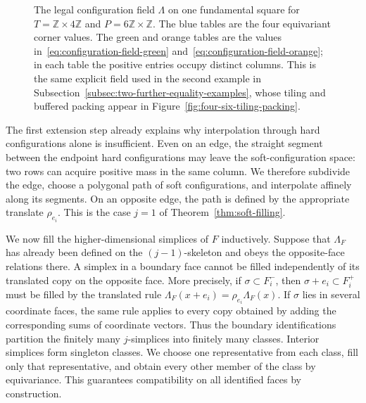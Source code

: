 \documentclass[11pt,reqno]{amsart}
\numberwithin{equation}{section}
\theoremstyle{definition}
\theoremstyle{remark}
\newcommand{\Z}{\mathbb Z}
\begin{document}
\begin{figure}[htbp]
\caption{The legal configuration field $\Lambda$ on one fundamental
square for $T=\Z\times4\Z$ and $P=6\Z\times\Z$.  The blue tables are the
four equivariant corner values.  The green and orange tables are the values
in~\eqref{eq:configuration-field-green} and~\eqref{eq:configuration-field-orange}; in
each table the positive entries occupy distinct columns.  This is the same
explicit field used in the second example in Subsection~\ref{subsec:two-further-equality-examples}, whose tiling
and buffered packing appear in Figure~\ref{fig:four-six-tiling-packing}.}
\label{fig:lambda-plane-configurations}
\end{figure}

The first extension step already explains why interpolation through hard configurations alone is insufficient.
Even on an edge, the straight segment between the endpoint hard
configurations may leave the soft-configuration space: two rows can acquire
positive mass in the same column.  We therefore subdivide the edge, choose a
polygonal path of soft configurations, and interpolate affinely along its
segments.  On an opposite edge, the path is defined by the appropriate
translate $\rho_{e_i}$.  This is the case $j=1$ of
Theorem~\ref{thm:soft-filling}.

We now fill the higher-dimensional simplices of $F$ inductively.  Suppose
that $\Lambda_F$ has already been defined on the $(j-1)$-skeleton and obeys
the opposite-face relations there.  A simplex in a boundary face cannot be
filled independently of its translated copy on the opposite face.  More
precisely, if $\sigma\subset F_i^-$, then $\sigma+e_i\subset F_i^+$ must be
filled by the translated rule $\Lambda_F(x+e_i)=\rho_{e_i}\Lambda_F(x)$.
If $\sigma$ lies in several coordinate faces, the same rule applies to every
copy obtained by adding the corresponding sums of coordinate vectors.
Thus the boundary identifications partition the finitely many $j$-simplices
into finitely many classes.  Interior simplices form singleton classes.  We
choose one representative from each class, fill only that representative,
and obtain every other member of the class by equivariance.  This guarantees
compatibility on all identified faces by construction.
\end{document}
